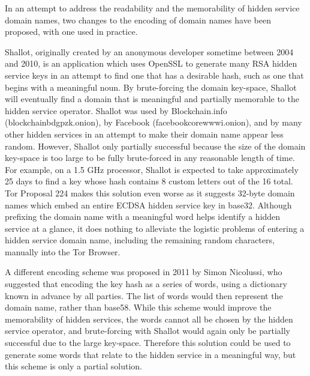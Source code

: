 In an attempt to address the readability and the memorability of hidden service domain names, two changes to the encoding of domain names have been proposed, with one used in practice.

Shallot, originally created by an anonymous developer sometime between 2004 and 2010, is an application which uses OpenSSL to generate many RSA hidden service keys in an attempt to find one that has a desirable hash, such as one that begins with a meaningful noun.\cite{KatmagicShallot} By brute-forcing the domain key-space, Shallot will eventually find a domain that is meaningful and partially memorable to the hidden service operator. Shallot was used by Blockchain.info (blockchainbdgpzk.onion), by Facebook (facebookcorewwwi.onion), and by many other hidden services in an attempt to make their domain name appear less random. However, Shallot only partially successful because the size of the domain key-space is too large to be fully brute-forced in any reasonable length of time. For example, on a 1.5 GHz processor, Shallot is expected to take approximately 25 days to find a key whose hash contains 8 custom letters out of the 16 total.\cite{KatmagicShallot} Tor Proposal 224 makes this solution even worse as it suggests 32-byte domain names which embed an entire ECDSA hidden service key in base32.\cite{Proposal224} Although prefixing the domain name with a meaningful word helps identify a hidden service at a glance, it does nothing to alleviate the logistic problems of entering a hidden service domain name, including the remaining random characters, manually into the Tor Browser.

A different encoding scheme was proposed in 2011 by Simon Nicolussi, who suggested that encoding the key hash as a series of words, using a dictionary known in advance by all parties. The list of words would then represent the domain name, rather than base58. While this scheme would improve the memorability of hidden services, the words cannot all be chosen by the hidden service operator, and brute-forcing with Shallot would again only be partially successful due to the large key-space. Therefore this solution could be used to generate some words that relate to the hidden service in a meaningful way, but this scheme is only a partial solution.\cite{nicolussi2011human}

